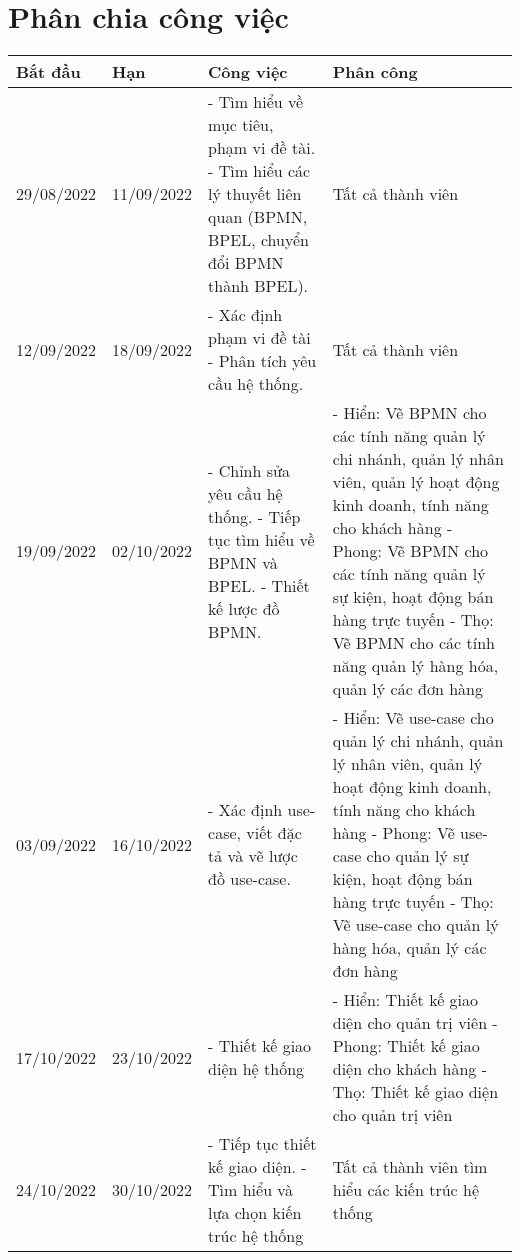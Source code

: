 \section{Phân chia công việc}
{
\setlength\extrarowheight{6pt}
\begin{longtable}{| p{2cm} | p{2cm} | p{4cm} | p{7cm}|}

	\hline
	\textbf{Bắt đầu} & \textbf{Hạn} & \textbf{Công việc}& \textbf{Phân công} \\
	\hline
	29/08/2022 & 11/09/2022 & 
	- Tìm hiểu về mục tiêu, phạm vi đề tài.
	\newline 
	- Tìm hiểu các lý thuyết liên quan (BPMN, BPEL, chuyển đổi BPMN thành BPEL). & Tất cả thành viên\\
	\hline
	12/09/2022 & 18/09/2022 & 
	- Xác định phạm vi đề tài
	\newline 
	- Phân tích yêu cầu hệ thống. & Tất cả thành viên \\
	\hline
	19/09/2022 & 02/10/2022 & 
	- Chỉnh sửa yêu cầu hệ thống.
	\newline
	- Tiếp tục tìm hiểu về BPMN và BPEL.
	\newline
	- Thiết kế lược đồ BPMN. & 
	- Hiển: Vẽ BPMN cho các tính năng quản lý chi nhánh, quản lý nhân viên, quản lý hoạt động kinh doanh, tính năng cho khách hàng 
	\newline
	- Phong: Vẽ BPMN cho các tính năng quản lý sự kiện, hoạt động bán hàng trực tuyến
	\newline
	- Thọ: Vẽ BPMN cho các tính năng quản lý hàng hóa, quản lý các đơn hàng \\
	\hline
	03/09/2022 & 16/10/2022 & 
	- Xác định use-case, viết đặc tả và vẽ lược đồ use-case. & 
	- Hiển: Vẽ use-case cho quản lý chi nhánh, quản lý nhân viên, quản lý hoạt động kinh doanh, tính năng cho khách hàng 
	\newline
	- Phong: Vẽ use-case cho quản lý sự kiện, hoạt động bán hàng trực tuyến
	\newline
	- Thọ: Vẽ use-case cho quản lý hàng hóa, quản lý các đơn hàng  \\
	\hline
	17/10/2022 & 23/10/2022 & 
	- Thiết kế giao diện hệ thống & 
	- Hiển: Thiết kế giao diện cho quản trị viên
	\newline
	- Phong: Thiết kế giao diện cho khách hàng
	\newline
	- Thọ: Thiết kế giao diện cho quản trị viên
	\\
	\hline
	24/10/2022 & 30/10/2022 & 
	- Tiếp tục thiết kế giao diện.
	\newline
	- Tìm hiểu và lựa chọn kiến trúc hệ thống & Tất cả thành viên tìm hiểu các kiến trúc hệ thống \\

\end{longtable}}
